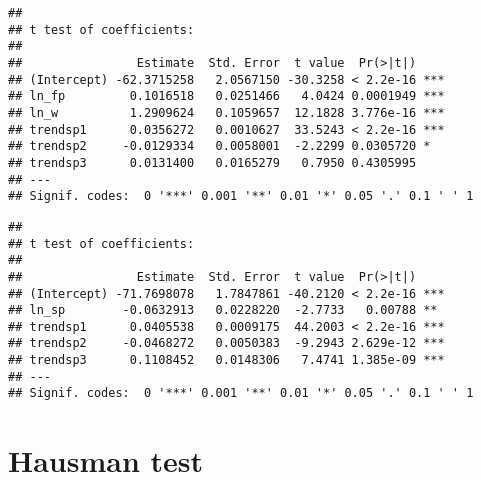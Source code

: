 \documentclass[]{article}
\newenvironment{Shaded}{\begin{snugshade}}{\end{snugshade}}
\newcommand{\KeywordTok}[1]{\textcolor[rgb]{0.13,0.29,0.53}{\textbf{{#1}}}}
\newcommand{\DataTypeTok}[1]{\textcolor[rgb]{0.13,0.29,0.53}{{#1}}}
\newcommand{\DecValTok}[1]{\textcolor[rgb]{0.00,0.00,0.81}{{#1}}}
\newcommand{\StringTok}[1]{\textcolor[rgb]{0.31,0.60,0.02}{{#1}}}
\newcommand{\NormalTok}[1]{{#1}}
\begin{document}
\begin{verbatim}
## 
## t test of coefficients:
## 
##                Estimate  Std. Error  t value  Pr(>|t|)    
## (Intercept) -62.3715258   2.0567150 -30.3258 < 2.2e-16 ***
## ln_fp         0.1016518   0.0251466   4.0424 0.0001949 ***
## ln_w          1.2909624   0.1059657  12.1828 3.776e-16 ***
## trendsp1      0.0356272   0.0010627  33.5243 < 2.2e-16 ***
## trendsp2     -0.0129334   0.0058001  -2.2299 0.0305720 *  
## trendsp3      0.0131400   0.0165279   0.7950 0.4305995    
## ---
## Signif. codes:  0 '***' 0.001 '**' 0.01 '*' 0.05 '.' 0.1 ' ' 1
\end{verbatim}

\begin{Shaded}
\end{Shaded}

\begin{verbatim}
## 
## t test of coefficients:
## 
##                Estimate  Std. Error  t value  Pr(>|t|)    
## (Intercept) -71.7698078   1.7847861 -40.2120 < 2.2e-16 ***
## ln_sp        -0.0632913   0.0228220  -2.7733   0.00788 ** 
## trendsp1      0.0405538   0.0009175  44.2003 < 2.2e-16 ***
## trendsp2     -0.0468272   0.0050383  -9.2943 2.629e-12 ***
## trendsp3      0.1108452   0.0148306   7.4741 1.385e-09 ***
## ---
## Signif. codes:  0 '***' 0.001 '**' 0.01 '*' 0.05 '.' 0.1 ' ' 1
\end{verbatim}

\section{Hausman test}\label{hausman-test}

\begin{Shaded}
\end{Shaded}
\end{document}

